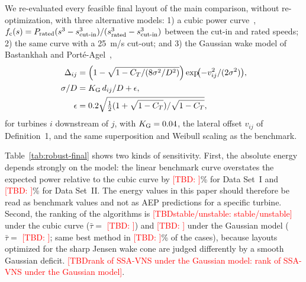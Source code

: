 \documentclass[journal,twoside]{IEEEtran}
\newcommand{\TBD}[1]{\textcolor{red}{[TBD\ifx\relax#1\relax\else: #1\fi]}}
\begin{document}
We re-evaluated every feasible final layout of the main comparison, without re-optimization, with three alternative models: 1) a cubic power curve~\cite{Carrillo2013}, $f_{\rm c}(s)=P_{\text{rated}}(s^3-s_{\text{cut-in}}^3)/(s_{\text{rated}}^3-s_{\text{cut-in}}^3)$ between the cut-in and rated speeds; 2) the same curve with a 25~m/s cut-out; and 3) the Gaussian wake model of Bastankhah and Port\'e-Agel~\cite{Bastankhah2014},
\begin{align*}
\Delta_{ij}&=\Bigl(1-\sqrt{1-C_T/(8\sigma^2/D^2)}\Bigr)\exp\!\bigl(-v_{ij}^2/(2\sigma^2)\bigr),\\
\sigma/D&=K_{\rm G}\,d_{ij}/D+\epsilon,\\
\epsilon&=0.2\sqrt{\tfrac12(1+\sqrt{1-C_T})/\sqrt{1-C_T}},
\end{align*}
for turbines $i$ downstream of $j$, with $K_{\rm G}=0.04$, the lateral offset $v_{ij}$ of Definition~1, and the same superposition and Weibull scaling as the benchmark.

Table~\ref{tab:robust-final} shows two kinds of sensitivity. First, the absolute energy depends strongly on the model: the linear benchmark curve overstates the expected power relative to the cubic curve by \TBD{}\% for Data Set~I and \TBD{}\% for Data Set~II. The energy values in this paper should therefore be read as benchmark values and not as AEP predictions for a specific turbine. Second, the ranking of the algorithms is \TBD{stable/unstable} under the cubic curve ($\bar\tau=$ \TBD{}) and \TBD{} under the Gaussian model ($\bar\tau=$ \TBD{}; same best method in \TBD{}\% of the cases), because layouts optimized for the sharp Jensen wake cone are judged differently by a smooth Gaussian deficit. \TBD{rank of SSA-VNS under the Gaussian model}.
\end{document}
